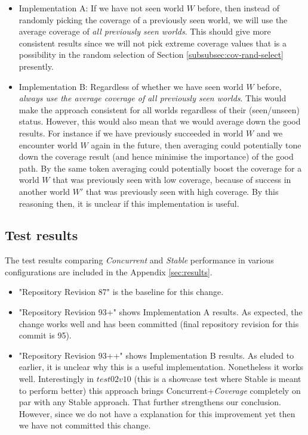 \documentclass[a4paper]{article}
\newcommand{\cc}{\emph{Concurrent}\xspace}
\newcommand{\st}{\emph{Stable}\xspace}
\newcommand{\cov}{\emph{Coverage}\xspace}
\begin{document}
\begin{itemize}

\item Implementation A: If we have not seen world $W$ before, then instead of randomly picking the coverage of a previously seen world, we will use the average coverage of \textit{all previously seen worlds}. This should give more consistent results since we will not pick extreme coverage values that is a possibility in the random selection of Section \ref{subsubsec:cov-rand-select} presently. 

\item Implementation B: Regardless of whether we have seen world $W$ before, \textit{always use the average coverage of all previously seen worlds}. This would make the approach consistent for all worlds regardless of their (seen/unseen) status. However, this would also mean that we would average down the good results. For instance if we have previously succeeded in world $W$ and we encounter world $W$ again in the future, then averaging could potentially tone down the coverage result (and hence minimise the importance) of the good path. By the same token averaging could potentially boost the coverage for a world $W$ that was previously seen with low coverage, because of success in another world $W'$ that was previously seen with high coverage. By this reasoning then, it is unclear if this implementation is useful.

\end{itemize}

\subsection{Test results}

The test results comparing \cc and \st performance in various configurations are included in the Appendix \ref{sec:results}.
\begin{itemize}
\item "Repository Revision 87" is the baseline for this change.

\item "Repository Revision 93+" shows Implementation A results. As expected, the change works well and has been committed (final repository revision for this commit is 95).

\item  "Repository Revision 93++" shows Implementation B results. As eluded to earlier, it is unclear why this is a useful implementation. Nonetheless it works well. Interestingly in $test02v10$ (this is a showcase test where Stable is meant to perform better) this approach brings Concurrent+\cov completely on par with any Stable approach. That further strengthens our conclusion. However, since we do not have a explanation for this improvement yet then we have not committed this change.

\end{itemize}
\end{document}
